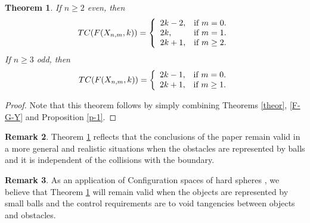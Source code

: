 \documentclass{amsart}
\newtheorem{thm}{Theorem}[section]
\theoremstyle{definition}
\newtheorem{rem}[thm]{Remark}
\numberwithin{equation}{section}
\begin{document}
\begin{thm}\label{theor-principal} If $n\geq 2$ even, then
\begin{equation} TC(F(X_{n,m},k))=\left\{
              \begin{array}{ll}
                2k-2, & \hbox{if $m=0$.} \\
                2k, & \hbox{if $m=1$.}\\
                2k+1, & \hbox{if $m\geq 2$.}
              \end{array}
            \right.\end{equation}
 If $n\geq 3$ odd, then \begin{equation} TC(F(X_{n,m},k))=\left\{
              \begin{array}{ll}
                2k-1, & \hbox{if $m=0$.} \\
                2k+1, & \hbox{if $m\geq 1$.}
              \end{array}
            \right.\end{equation}
\end{thm}
\begin{proof}
Note that this theorem follows by simply combining Theorems \ref{theor}, \ref{F-G-Y} and Proposition \ref{p-1}.
\end{proof}

\begin{rem}
Theorem \ref{theor-principal} reflects  that the conclusions of the paper \cite{farber2007topological} remain valid in a more general and realistic situations when the obstacles are represented by balls and it is independent of the collisions with the boundary.
\end{rem}

\begin{rem}
As an application of Configuration spaces of hard spheres \cite{yuliy1014mintype},  we believe that Theorem \ref{theor-principal} will remain valid when the objects are represented by small balls and the control requirements are to void tangencies between objects and obstacles.
\end{rem}
\end{document}

